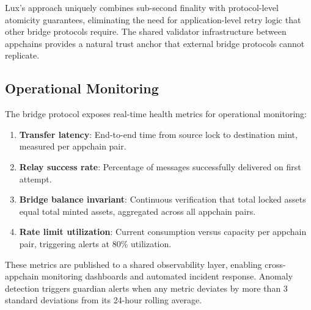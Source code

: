 Lux's approach uniquely combines sub-second finality with protocol-level atomicity guarantees, eliminating the need for application-level retry logic that other bridge protocols require. The shared validator infrastructure between appchains provides a natural trust anchor that external bridge protocols cannot replicate.

\subsection{Operational Monitoring}

The bridge protocol exposes real-time health metrics for operational monitoring:

\begin{enumerate}
    \item \textbf{Transfer latency}: End-to-end time from source lock to destination mint, measured per appchain pair.
    \item \textbf{Relay success rate}: Percentage of messages successfully delivered on first attempt.
    \item \textbf{Bridge balance invariant}: Continuous verification that total locked assets equal total minted assets, aggregated across all appchain pairs.
    \item \textbf{Rate limit utilization}: Current consumption versus capacity per appchain pair, triggering alerts at 80\% utilization.
\end{enumerate}

These metrics are published to a shared observability layer, enabling cross-appchain monitoring dashboards and automated incident response. Anomaly detection triggers guardian alerts when any metric deviates by more than 3 standard deviations from its 24-hour rolling average.

